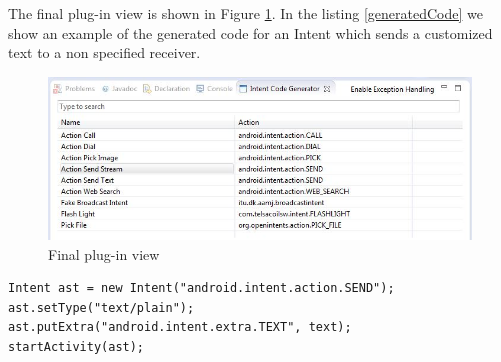 The final plug-in view is shown in Figure \ref{codegeneratorview}. In the listing \ref{generatedCode} we show an example of the generated code for an Intent which sends a customized text to a non specified receiver.

\begin{figure}[t]
\label{codegeneratorview}
  \centering
    \includegraphics[width=\textwidth]{codegenerator}
  \caption{Final plug-in view}
\end{figure}

{\footnotesize\begin{lstlisting}[label=generatedCode,caption=Generated code of an Intent]
Intent ast = new Intent("android.intent.action.SEND");
ast.setType("text/plain");
ast.putExtra("android.intent.extra.TEXT", text);
startActivity(ast);		
\end{lstlisting}}